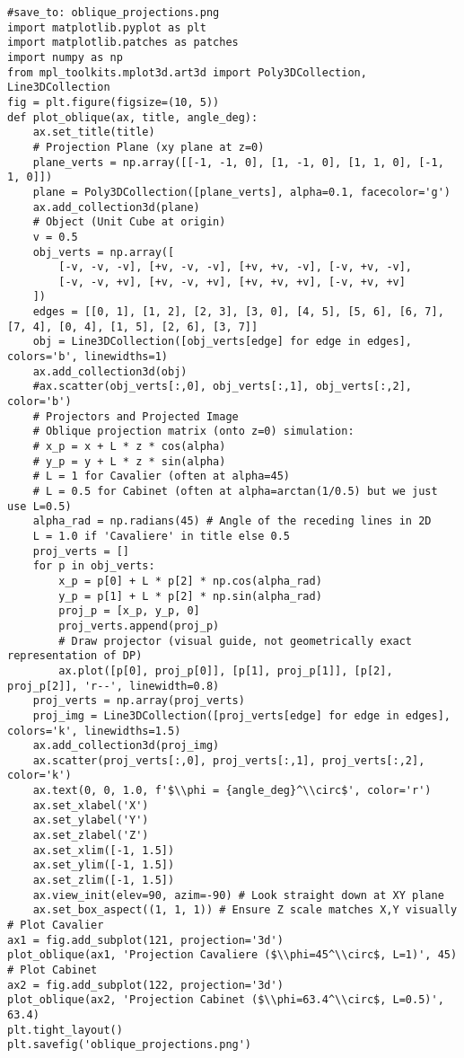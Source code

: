 \begin{verbatim}
#save_to: oblique_projections.png
import matplotlib.pyplot as plt
import matplotlib.patches as patches
import numpy as np
from mpl_toolkits.mplot3d.art3d import Poly3DCollection, Line3DCollection
fig = plt.figure(figsize=(10, 5))
def plot_oblique(ax, title, angle_deg):
    ax.set_title(title)
    # Projection Plane (xy plane at z=0)
    plane_verts = np.array([[-1, -1, 0], [1, -1, 0], [1, 1, 0], [-1, 1, 0]])
    plane = Poly3DCollection([plane_verts], alpha=0.1, facecolor='g')
    ax.add_collection3d(plane)
    # Object (Unit Cube at origin)
    v = 0.5
    obj_verts = np.array([
        [-v, -v, -v], [+v, -v, -v], [+v, +v, -v], [-v, +v, -v],
        [-v, -v, +v], [+v, -v, +v], [+v, +v, +v], [-v, +v, +v]
    ])
    edges = [[0, 1], [1, 2], [2, 3], [3, 0], [4, 5], [5, 6], [6, 7], [7, 4], [0, 4], [1, 5], [2, 6], [3, 7]]
    obj = Line3DCollection([obj_verts[edge] for edge in edges], colors='b', linewidths=1)
    ax.add_collection3d(obj)
    #ax.scatter(obj_verts[:,0], obj_verts[:,1], obj_verts[:,2], color='b')
    # Projectors and Projected Image
    # Oblique projection matrix (onto z=0) simulation:
    # x_p = x + L * z * cos(alpha)
    # y_p = y + L * z * sin(alpha)
    # L = 1 for Cavalier (often at alpha=45)
    # L = 0.5 for Cabinet (often at alpha=arctan(1/0.5) but we just use L=0.5)
    alpha_rad = np.radians(45) # Angle of the receding lines in 2D
    L = 1.0 if 'Cavaliere' in title else 0.5
    proj_verts = []
    for p in obj_verts:
        x_p = p[0] + L * p[2] * np.cos(alpha_rad)
        y_p = p[1] + L * p[2] * np.sin(alpha_rad)
        proj_p = [x_p, y_p, 0]
        proj_verts.append(proj_p)
        # Draw projector (visual guide, not geometrically exact representation of DP)
        ax.plot([p[0], proj_p[0]], [p[1], proj_p[1]], [p[2], proj_p[2]], 'r--', linewidth=0.8)
    proj_verts = np.array(proj_verts)
    proj_img = Line3DCollection([proj_verts[edge] for edge in edges], colors='k', linewidths=1.5)
    ax.add_collection3d(proj_img)
    ax.scatter(proj_verts[:,0], proj_verts[:,1], proj_verts[:,2], color='k')
    ax.text(0, 0, 1.0, f'$\\phi = {angle_deg}^\\circ$', color='r')
    ax.set_xlabel('X')
    ax.set_ylabel('Y')
    ax.set_zlabel('Z')
    ax.set_xlim([-1, 1.5])
    ax.set_ylim([-1, 1.5])
    ax.set_zlim([-1, 1.5])
    ax.view_init(elev=90, azim=-90) # Look straight down at XY plane
    ax.set_box_aspect((1, 1, 1)) # Ensure Z scale matches X,Y visually
# Plot Cavalier
ax1 = fig.add_subplot(121, projection='3d')
plot_oblique(ax1, 'Projection Cavaliere ($\\phi=45^\\circ$, L=1)', 45)
# Plot Cabinet
ax2 = fig.add_subplot(122, projection='3d')
plot_oblique(ax2, 'Projection Cabinet ($\\phi=63.4^\\circ$, L=0.5)', 63.4)
plt.tight_layout()
plt.savefig('oblique_projections.png')
\end{verbatim}
